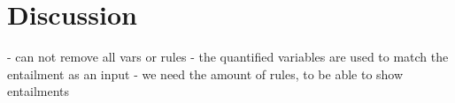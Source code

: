 \chapter{Discussion}

- can not remove all vars or rules
- the quantified variables are used to match the entailment as an input
- we need the amount of rules, to be able to show entailments

